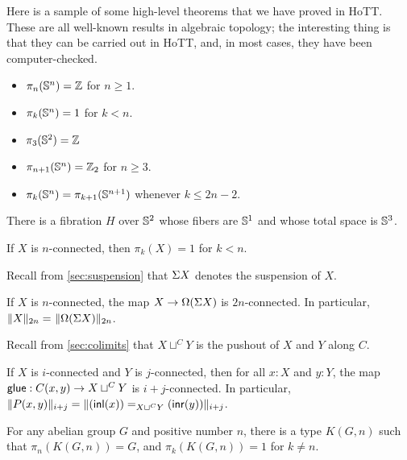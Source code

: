 Here is a sample of some high-level theorems that we have proved in
HoTT.  These are all well-known results in algebraic topology; the
interesting thing is that they can be carried out in HoTT, and, in most
cases, they have been computer-checked.

\begin{thm} \mbox{}
\begin{itemize}
\item $\pi_n(\Sn ^n) = \Z$ for $n \ge 1$.
\item $\pi_k(\Sn ^n) = 1$ for $k < n$.  
\item $\pi_3(\Sn ^2) = \Z$
\item $\pi_{n+1}(\Sn ^n) = \Z_2$ for $n \ge 3$.    
\item $\pi_k(\Sn ^n) = \pi_{k+1}(\Sn ^{n+1})$ whenever $k \le 2n - 2$.  
\end{itemize}
\end{thm}

\begin{thm}
There is a fibration $H$ over $\Sn ^2$ whose fibers are $\Sn ^1$ and
whose total space is $\Sn ^3$.  
\end{thm}

\begin{thm}
  If $X$ is $n$-connected, then $\pi_k(X) = 1$ for $k < n$.
\end{thm}

Recall from \autoref{sec:suspension} that $\susp X$ denotes the suspension of $X$.

\begin{thm}
  If $X$ is $n$-connected, the map $X \rightarrow \Omega(\susp X)$ is $2n$-connected.
  In particular, $\id{\trunc{2n}{X}}{\trunc{2n}{\Omega(\susp X)}}$.
\end{thm}

Recall from \autoref{sec:colimits} that $X \sqcup^C Y$ is the pushout of $X$ and $Y$ along $C$.

\begin{thm}
  If $X$ is $i$-connected and $Y$ is
  $j$-connected, then for all $x:X$ and $y:Y$, the map $\glue : C(x,y)
  \rightarrow X \sqcup^C Y$ is $i+j$-connected.  In
  particular, $\trunc {i+j} {P(x,y)} = \trunc {i+j} {\id [X \sqcup^C Y]
    {(\inl(x))} {(\inr(y))}}$.
\end{thm}

\begin{thm}
For any abelian group $G$ and positive number $n$, there is a type
$K(G,n)$ such that $\pi_n(K(G,n)) = G$, and  $\pi_k(K(G,n)) = 1$
for $k\neq n$.
\end{thm}

